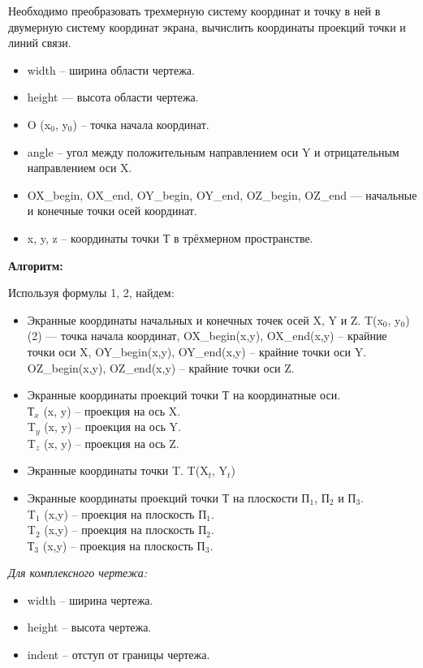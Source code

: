 \documentclass[13pt]{extarticle}
\begin{document}
Необходимо преобразовать трехмерную систему координат и точку в ней в двумерную систему координат экрана, вычислить координаты проекций точки и линий связи.

	\begin{itemize}
		\item width -- ширина области чертежа.
		\item height — высота области чертежа.
		\item O (x$_0$, y$_0$) -- точка начала координат.
		\item angle -- угол между положительным направлением оси Y и отрицательным направлением оси X.
		\item OX\_begin, OX\_end, OY\_begin, OY\_end, OZ\_begin, OZ\_end — начальные и конечные точки осей координат.
		\item x, y, z -- координаты точки Т в трёхмерном пространстве.
	\end{itemize}
	
\textbf{Алгоритм:}

Используя формулы 1, 2, найдем:

	\begin{itemize}
		\item Экранные координаты начальных и конечных точек осей X, Y и Z.
T(x$_0$, y$_0$) (2) — точка начала координат, OX\_begin(x,y), OX\_end(x,y) -- крайние точки оси X, OY\_begin(x,y), OY\_end(x,y) -- крайние точки оси Y. OZ\_begin(x,y), OZ\_end(x,y) -- крайние точки оси Z.
		\item Экранные координаты проекций точки Т на координатные оси.\\
Т$_x$ (x, y) -- проекция на ось X.\\
T$_y$ (x, y) -- проекция на ось Y.\\
T$_z$ (x, y) -- проекция на ось Z.\\
		\item Экранные координаты точки T. T(X$_t$, Y$_t$)
		\item Экранные координаты проекций точки Т на плоскости П$_1$, П$_2$ и П$_3$.\\
T$_1$ (x,y) -- проекция на плоскость П$_1$.\\
T$_2$ (x,y) -- проекция на плоскость П$_2$.\\
Т$_3$ (x,y) -- проекция на плоскость П$_3$.

	\end{itemize}
	
	\emph{Для комплексного чертежа:}
	
	\begin{itemize}
		\item width -- ширина чертежа.
		\item height -- высота чертежа.
		\item indent -- отступ от границы чертежа.  

	\end{itemize}
	
\end{document}
